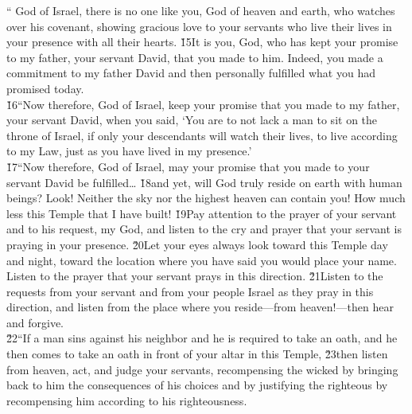 \begin{poetry}
\poeml `` God of Israel, there is no one like you, God of heaven and earth, who watches over his covenant, showing gracious love to your servants who live their lives in your presence with all their hearts. \v{15}It is you,  God, who has kept your promise to my father, your servant David, that you made to him. Indeed, you made a commitment to my father David and then personally fulfilled what you had promised today. \\
\poeml \v{16}``Now therefore,  God of Israel, keep your promise that you made to my father, your servant David, when you said, `You are to not lack a man to sit on the throne of Israel, if only your descendants will watch their lives, to live according to my Law, just as you have lived in my presence.' \\
\poeml \v{17}``Now therefore,  God of Israel, may your promise that you made to your servant David be fulfilled{\ldots} \v{18}and yet, will God truly reside on earth with human beings? Look! Neither the sky nor the highest heaven can contain you! How much less this Temple that I have built! \v{19}Pay attention to the prayer of your servant and to his request,  my God, and listen to the cry and prayer that your servant is praying in your presence. \v{20}Let your eyes always look toward this Temple day and night, toward the location where you have said you would place your name. Listen to the prayer that your servant prays in this direction. \v{21}Listen to the requests from your servant and from your people Israel as they pray in this direction, and listen from the place where you reside---from heaven!---then hear and forgive. \\
\poeml \v{22}``If a man sins against his neighbor and he is required to take an oath, and he then comes to take an oath in front of your altar in this Temple, \v{23}then listen from heaven, act, and judge your servants, recompensing the wicked by bringing back to him the consequences of his choices and by justifying the righteous by recompensing him according to his righteousness. \\

\end{poetry}
